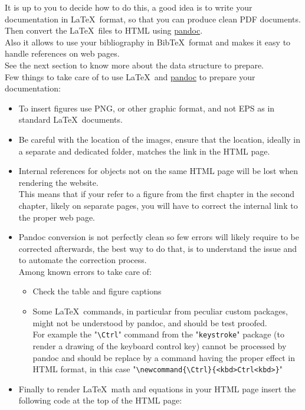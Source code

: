 It is up to you to decide how to do this, a good idea is to write your documentation in \LaTeX\ format, so that you can produce clean PDF documents. 
Then convert the \LaTeX\ files to HTML using \href{https://pandoc.org/}{pandoc}. \\
Also it allows to use your bibliography in Bib\TeX\ format and makes it easy to handle references on web pages. \\[0.25cm]
See the next section to know more about the data structure to prepare. \\[0.25cm]
Few things to take care of to use \LaTeX\ and \href{https://pandoc.org/}{pandoc} to prepare your documentation:
\begin{itemize}
\item To insert figures use PNG, or other graphic format, and not EPS as in standard \LaTeX\ documents. 
\item Be careful with the location of the images, ensure that the location, ideally in a separate and dedicated folder, 
matches the link in the HTML page. 
\item Internal references for objects not on the same HTML page will be lost when rendering the website. \\
This means that if your refer to a figure from the first chapter in the second chapter, likely on separate pages, 
you will have to correct the internal link to the proper web page. 
\item Pandoc conversion is not perfectly clean so few errors will likely require to be corrected afterwards, the best way 
to do that, is to understand the issue and to automate the correction process. \\
Among known errors to take care of:
\begin{itemize}
\item Check the table and figure captions
\item Some \LaTeX\ commands, in particular from peculiar custom packages, might not be understood by pandoc, and should be test proofed. \\[0.25cm]
For example the "\texttt{\textbackslash{Ctrl}}" command from the "\texttt{keystroke}" package (to render a drawing of the keyboard control key) 
cannot be processed by pandoc and should be replace by a command having the proper effect in HTML format, 
in this case "\texttt{\textbackslash{newcommand}\{\textbackslash{Ctrl}\}\{<kbd>Ctrl<\/kbd>\}}"
\end{itemize}
\item Finally to render \LaTeX\ math and equations in your HTML page insert the following code at the top of the HTML page:

\end{itemize}

